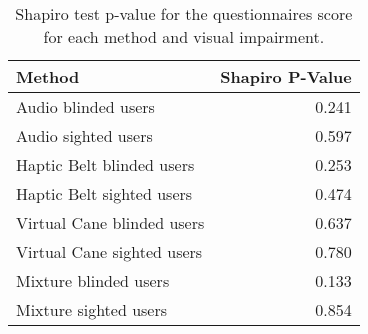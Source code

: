 
\begin{table}[!htb]
\centering
\caption{Shapiro test p-value for the questionnaires score for each method and visual impairment.}
\label{tab:shapiro_questionnaires}
\begin{tabular}{lr}
\toprule
                    Method &  Shapiro P-Value \\
\midrule
       Audio blinded users &            0.241 \\
       Audio sighted users &            0.597 \\
 Haptic Belt blinded users &            0.253 \\
 Haptic Belt sighted users &            0.474 \\
Virtual Cane blinded users &            0.637 \\
Virtual Cane sighted users &            0.780 \\
     Mixture blinded users &            0.133 \\
     Mixture sighted users &            0.854 \\
\bottomrule
\end{tabular}
\end{table}

